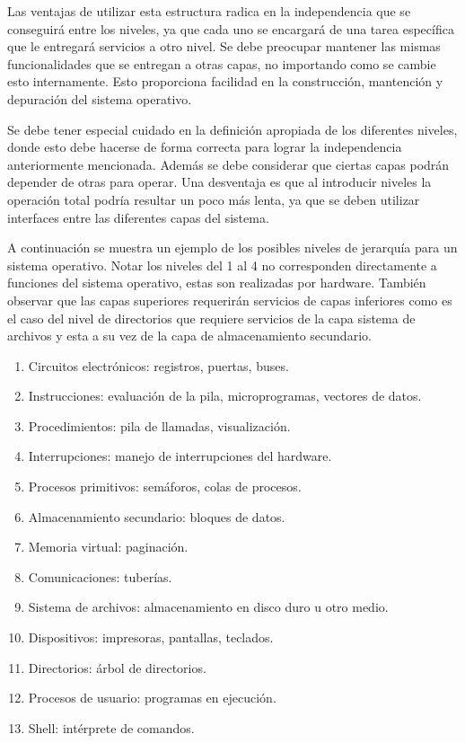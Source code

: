 Las ventajas de utilizar esta estructura radica en la independencia que se
conseguirá entre los niveles, ya que cada uno se encargará de una tarea
específica que le entregará servicios a otro nivel. Se debe preocupar mantener
las mismas funcionalidades que se entregan a otras capas, no importando como se
cambie esto internamente. Esto proporciona facilidad en la construcción,
mantención y depuración del sistema operativo.

Se debe tener especial cuidado en la definición apropiada de los diferentes
niveles, donde esto debe hacerse de forma correcta para lograr la independencia
anteriormente mencionada. Además se debe considerar que ciertas capas podrán
depender de otras para operar. Una desventaja es que al introducir niveles la
operación total podría resultar un poco más lenta, ya que se deben utilizar
interfaces entre las diferentes capas del sistema.

A continuación se muestra un ejemplo de los posibles niveles de jerarquía para
un sistema operativo. Notar los niveles del 1 al 4 no corresponden directamente
a funciones del sistema operativo, estas son realizadas por hardware. También
observar que las capas superiores requerirán servicios de capas inferiores como
es el caso del nivel de directorios que requiere servicios de la capa sistema de
archivos y esta a su vez de la capa de almacenamiento secundario.

\begin{enumerate}

	\item Circuitos electrónicos: registros, puertas, buses.

	\item Instrucciones: evaluación de la pila, microprogramas, vectores de
	datos.

	\item Procedimientos: pila de llamadas, visualización.

	\item Interrupciones: manejo de interrupciones del hardware.

	\item Procesos primitivos: semáforos, colas de procesos.

	\item Almacenamiento secundario: bloques de datos.

	\item Memoria virtual: paginación.

	\item Comunicaciones: tuberías.

	\item Sistema de archivos: almacenamiento en disco duro u otro medio.

	\item Dispositivos: impresoras, pantallas, teclados.

	\item Directorios: árbol de directorios.

	\item Procesos de usuario: programas en ejecución.

	\item Shell: intérprete de comandos.

\end{enumerate}

